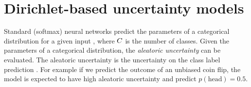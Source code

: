 \section{Dirichlet-based uncertainty models}
\label{sec:dirichlet_models_008}
%
Standard (softmax) neural networks predict the parameters of a categorical distribution  for a given input , where $C$ is the number of classes. 
Given the parameters of a categorical distribution, the \emph{ aleatoric uncertainty} can be evaluated. The aleatoric uncertainty is the uncertainty on the class label prediction . For example if we predict the outcome of an unbiased coin flip, the model is expected to have high aleatoric uncertainty and predict $p(\text{head})=0.5$.

\begin{table*}[ht]
	\centering
	\caption{Summary of DBU models. Further details on the loss functions are provided in the appendix.}
	\label{tab:dirichlet_models}
\end{table*}


